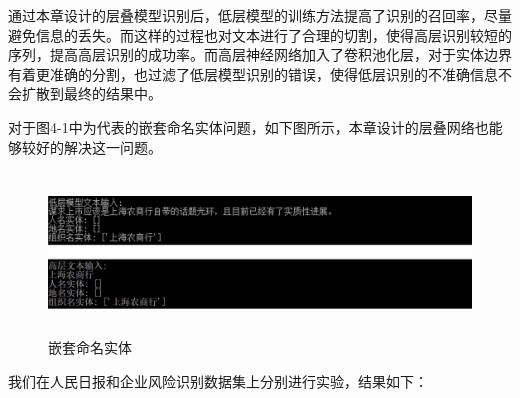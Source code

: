 \documentclass[winfonts,master,oneside,nobackinfo]{njuthesis}
\begin{document}
通过本章设计的层叠模型识别后，低层模型的训练方法提高了识别的召回率，尽量避免信息的丢失。而这样的过程也对文本进行了合理的切割，使得高层识别较短的序列，提高高层识别的成功率。而高层神经网络加入了卷积池化层，对于实体边界有着更准确的分割，也过滤了低层模型识别的错误，使得低层识别的不准确信息不会扩散到最终的结果中。

对于图4-1中为代表的嵌套命名实体问题，如下图所示，本章设计的层叠网络也能够较好的解决这一问题。

\begin{figure}[H]
\centering
\begin{minipage}[t]{\textwidth}
\includegraphics[width=1\textwidth,height=4.3cm]{./figure/层叠模型嵌套命名实体.jpg}
\caption{嵌套命名实体}
\label{lab:1}
\end{minipage}
\end{figure}

我们在人民日报和企业风险识别数据集上分别进行实验，结果如下：
\end{document}
